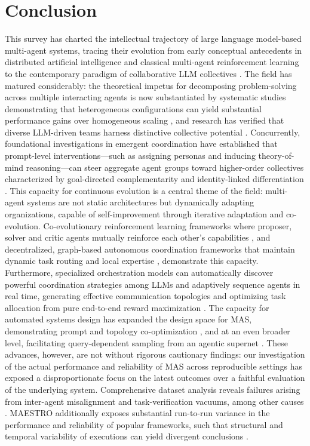 \documentclass[11pt,a4paper]{article}
\begin{document}
\section{Conclusion}


This survey has charted the intellectual trajectory of large language model-based multi-agent systems, tracing their evolution from early conceptual antecedents in distributed artificial intelligence and classical multi-agent reinforcement learning to the contemporary paradigm of collaborative LLM collectives \cite{arxiv:2503.21460v1,arxiv:2503.13415v1}. The field has matured considerably: the theoretical impetus for decomposing problem-solving across multiple interacting agents is now substantiated by systematic studies demonstrating that heterogeneous configurations can yield substantial performance gains over homogeneous scaling \cite{arxiv:2602.03794v1}, and research has verified that diverse LLM-driven teams harness distinctive collective potential \cite{arxiv:2406.04692v1,arxiv:2505.16997v1}. Concurrently, foundational investigations in emergent coordination have established that prompt-level interventions---such as assigning personas and inducing theory-of-mind reasoning---can steer aggregate agent groups toward higher-order collectives characterized by goal-directed complementarity and identity-linked differentiation \cite{arxiv:2510.05174v4}. This capacity for continuous evolution is a central theme of the field: multi-agent systems are not static architectures but dynamically adapting organizations, capable of self-improvement through iterative adaptation and co-evolution. Co-evolutionary reinforcement learning frameworks where proposer, solver and critic agents mutually reinforce each other's capabilities \cite{arxiv:2510.23595v3}, and decentralized, graph-based autonomous coordination frameworks that maintain dynamic task routing and local expertise \cite{arxiv:2504.00587v2}, demonstrate this capacity. Furthermore, specialized orchestration models can automatically discover powerful coordination strategies among LLMs and adaptively sequence agents in real time, generating effective communication topologies and optimizing task allocation from pure end-to-end reward maximization \cite{arxiv:2512.04388v5}. The capacity for automated systems design has expanded the design space for MAS, demonstrating prompt and topology co-optimization \cite{arxiv:2506.02718v2,arxiv:2502.02533v2}, and at an even broader level, facilitating query-dependent sampling from an agentic supernet \cite{arxiv:2502.04180v2}. These advances, however, are not without rigorous cautionary findings: our investigation of the actual performance and reliability of MAS across reproducible settings has exposed a disproportionate focus on the latest outcomes over a faithful evaluation of the underlying system. Comprehensive dataset analysis reveals failures arising from inter-agent misalignment and task-verification vacuums, among other causes \cite{arxiv:2503.13657v3}. MAESTRO additionally exposes substantial run-to-run variance in the performance and reliability of popular frameworks, such that structural and temporal variability of executions can yield divergent conclusions \cite{arxiv:2601.00481v1}.
\end{document}
